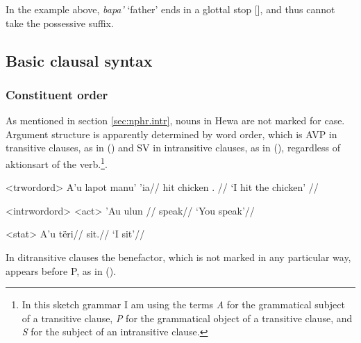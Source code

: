 \documentclass[../hewa_main-subfiles.tex]{subfiles}
\begin{document}
In the example above, \textit{bapa'} `father' ends in a glottal stop [\textglotstop], and thus cannot take the possessive suffix.




\subsection{Basic clausal syntax}

\subsubsection{Constituent order}

As mentioned in section \ref{sec:nphr.intr}, nouns in Hewa are not marked for case. Argument structure is apparently determined by word order, which is AVP in transitive clauses, as in () and SV in intransitive clauses, as in (), regardless of aktionsart of the verb.\footnote{In this sketch grammar I am using the terms \textit{A} for the grammatical subject of a transitive clause, \textit{P} for the grammatical object of a transitive clause, and \textit{S} for the subject of an intransitive clause.}.

\ex<trwordord>
\begingl %
\gla A'u lapot manu' 'ia//
\glb \First{}\Sg{} hit chicken \Def{}.\Sg{} //
\glft `I hit the chicken' // 
\endgl
\xe

\pex<intrwordord> %
\a<act> %
\begingl %
\gla 'Au ulun //
\glb \Second{}\Sg{} speak//
\glft `You speak'//
\endgl

\a<stat> %
\begingl %
\gla A'u tëri//
\glb \First{}\Sg{} sit.\First{}\Sg//
\glft `I sit'// 
\endgl
\xe

In ditransitive clauses the benefactor, which is not marked in any particular way, appears before P, as in ().
\end{document}
